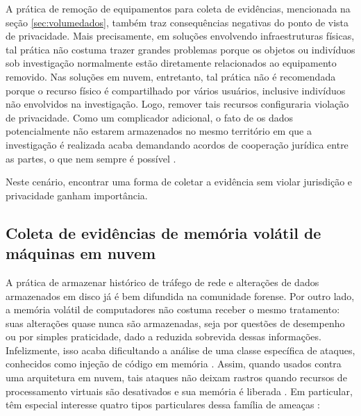 %
%
%
A prática de remoção de equipamentos para coleta de evidências, mencionada na seção \ref{sec:volumedados}, também traz consequências negativas do ponto de vista de privacidade.
%
Mais precisamente, em soluções envolvendo infraestruturas físicas, tal prática não costuma trazer grandes problemas porque os objetos ou indivíduos sob investigação normalmente estão diretamente relacionados ao equipamento removido.
%
Nas soluções em nuvem, entretanto, tal prática não é recomendada porque o recurso físico é compartilhado por vários usuários, inclusive indivíduos não envolvidos na investigação.
%
Logo, remover tais recursos configuraria violação de privacidade.
%
Como um complicador adicional, o fato de os dados potencialmente não estarem armazenados no mesmo território em que a investigação é realizada acaba demandando acordos de cooperação jurídica entre as partes, o que nem sempre é possível \cite{SimouCloudChlng:2014}.


Neste cenário, encontrar uma forma de coletar a evidência sem violar jurisdição e privacidade ganham importância.


\subsection{Coleta de evidências de memória volátil de máquinas em nuvem}
\label{sec:forensenuvem}

A prática de armazenar histórico de tráfego de rede e alterações de dados armazenados em disco já é bem difundida na comunidade forense.
%
Por outro lado, a memória volátil de computadores não costuma receber o mesmo tratamento: suas alterações quase nunca são armazenadas, seja por questões de desempenho ou por simples praticidade, dado a reduzida sobrevida dessas informações.
%
Infelizmente, isso acaba dificultando a análise de uma classe específica de ataques, conhecidos como injeção de código em memória \cite{CaseMemoryForensics:2014}. 
%
Assim, quando usados contra uma arquitetura em nuvem, tais ataques não deixam rastros quando recursos de processamento virtuais são desativados e sua memória é liberada \cite{VomelMemoryAcquisition:2013,CaseMemoryForensics:2014}.
%
Em particular, têm especial interesse quatro tipos particulares dessa família de ameaças \cite{CaseMemoryForensics:2014}:


